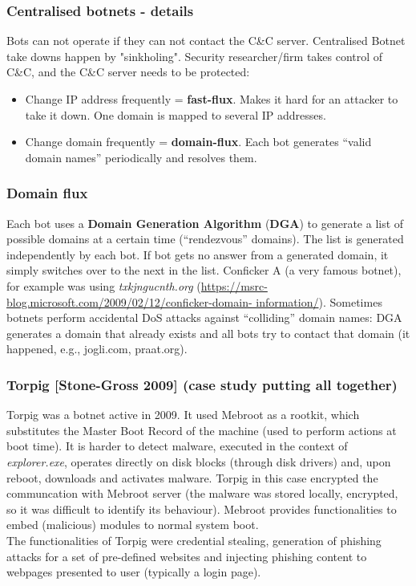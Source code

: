 \documentclass[a4paper, 10pt, titlepage]{article}
\begin{document}
\subsubsection*{Centralised botnets - details}
Bots can not operate if they can not contact the C\&C server. Centralised Botnet take downs happen by "sinkholing". Security researcher/firm takes control of C\&C, and the C\&C server needs to be protected:
\begin{itemize}
	\item Change IP address frequently = \textbf{fast-flux}. Makes it hard for an attacker to take it down. One domain is mapped to several IP addresses.
	\item Change domain frequently = \textbf{domain-flux}. Each bot generates “valid domain names” periodically and resolves them.
\end{itemize}

\subsubsection*{Domain flux}
Each bot uses a \textbf{Domain Generation Algorithm} (\textbf{DGA}) to generate a list of possible domains at a certain time (“rendezvous” domains). The list is generated independently by each bot. If bot gets no answer from a generated domain, it simply switches over to the next in the list.
Conficker A (a very famous botnet), for example was using \textit{txkjngucnth.org} (\url{https://msrc-blog.microsoft.com/2009/02/12/conficker-domain-
	information/}). 
Sometimes botnets perform accidental DoS attacks against “colliding” domain names: DGA generates a domain that already exists and all bots try to contact that domain (it happened, e.g., jogli.com, praat.org).

\subsubsection{Torpig [Stone-Gross 2009] (case study putting all together)}
Torpig was a botnet active in 2009. It used Mebroot as a rootkit, which substitutes the Master Boot Record of the machine (used to perform actions at boot time). It is harder to detect malware, executed in the context of \textit{explorer.exe}, operates directly on disk blocks (through disk drivers) and, upon reboot, downloads and activates malware. Torpig in this case encrypted the communcation with Mebroot server (the malware was stored locally, encrypted, so it was difficult to identify its behaviour). Mebroot provides functionalities to embed (malicious) modules to normal system boot. \medskip\\
The functionalities of Torpig were credential stealing, generation of phishing attacks for a set of pre-defined websites and injecting phishing content to webpages presented to user (typically a login page). 
\end{document}
